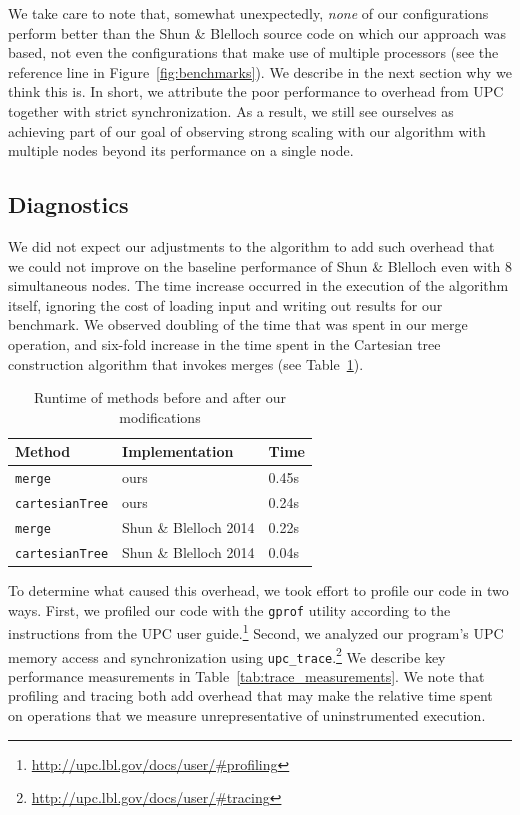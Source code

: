 \documentclass[10pt]{article}
\begin{document}
We take care to note that, somewhat unexpectedly, \emph{none} of our configurations perform better
than the Shun \& Blelloch source code on which our approach was based, not even the configurations
that make use of multiple processors (see the reference line in Figure~\ref{fig:benchmarks}).
We describe in the next section why we think this is.
In short, we attribute the poor performance to overhead from UPC together with strict 
synchronization.
As a result, we still see ourselves as achieving part of our goal of observing strong scaling with
our algorithm with multiple nodes beyond its performance on a single node.

\subsection{Diagnostics}

We did not expect our adjustments to the algorithm to add such overhead that we could not
improve on the baseline performance of Shun \& Blelloch even with 8 simultaneous nodes.
The time increase occurred in the execution of the algorithm itself, ignoring the cost of loading
input and writing out results for our benchmark.
We observed doubling of the time that was spent in our merge operation, and six-fold increase
in the time spent in the Cartesian tree construction algorithm that invokes merges
(see Table~\ref{tab:method_performance}).

\begin{table}[t]
\caption{Runtime of methods before and after our modifications}
\vspace{1.5ex}
\label{tab:method_performance}
\centering
\begin{tabular}{lll}
\toprule
\textbf{Method} & \textbf{Implementation} & \textbf{Time} \\
\midrule
\texttt{merge} & ours & 0.45s \\
\midrule
\texttt{cartesianTree} & ours & 0.24s \\
\midrule
\texttt{merge} & Shun \& Blelloch 2014 & 0.22s \\
\midrule
\texttt{cartesianTree} & Shun \& Blelloch 2014 & 0.04s \\
\end{tabular}
\end{table}

To determine what caused this overhead, we took effort to profile our code in two ways.
First, we profiled our code with the \texttt{gprof} utility according to the instructions from
the UPC user guide.\footnote{\url{http://upc.lbl.gov/docs/user/#profiling}}
Second, we analyzed our program's UPC memory access and synchronization using 
\texttt{upc\_trace}.\footnote{\url{http://upc.lbl.gov/docs/user/#tracing}}
We describe key performance measurements in Table~\ref{tab:trace_measurements}.
We note that profiling and tracing both add overhead that may make the relative time spent on
operations that we measure unrepresentative of uninstrumented execution.
\end{document}
